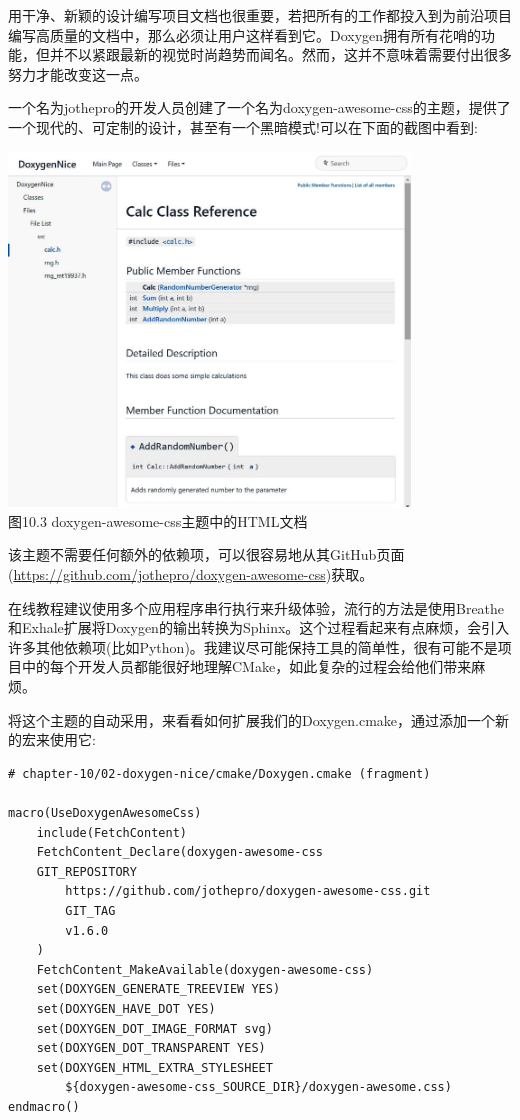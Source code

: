 

用干净、新颖的设计编写项目文档也很重要，若把所有的工作都投入到为前沿项目编写高质量的文档中，那么必须让用户这样看到它。Doxygen拥有所有花哨的功能，但并不以紧跟最新的视觉时尚趋势而闻名。然而，这并不意味着需要付出很多努力才能改变这一点。

一个名为jothepro的开发人员创建了一个名为doxygen-awesome-css的主题，提供了一个现代的、可定制的设计，甚至有一个黑暗模式!可以在下面的截图中看到:

\begin{center}
\includegraphics[width=0.8\textwidth]{content/3/chapter10/images/3.jpg}\\
图10.3  doxygen-awesome-css主题中的HTML文档
\end{center}

该主题不需要任何额外的依赖项，可以很容易地从其GitHub页面(\url{https://github.com/jothepro/doxygen-awesome-css})获取。

\begin{tcolorbox}[colback=blue!5!white,colframe=blue!75!black,title=Note]
在线教程建议使用多个应用程序串行执行来升级体验，流行的方法是使用Breathe和Exhale扩展将Doxygen的输出转换为Sphinx。这个过程看起来有点麻烦，会引入许多其他依赖项(比如Python)。我建议尽可能保持工具的简单性，很有可能不是项目中的每个开发人员都能很好地理解CMake，如此复杂的过程会给他们带来麻烦。
\end{tcolorbox}

将这个主题的自动采用，来看看如何扩展我们的Doxygen.cmake，通过添加一个新的宏来使用它:

\begin{lstlisting}[style=styleCMake]
# chapter-10/02-doxygen-nice/cmake/Doxygen.cmake (fragment)

macro(UseDoxygenAwesomeCss)
	include(FetchContent)
	FetchContent_Declare(doxygen-awesome-css
	GIT_REPOSITORY
		https://github.com/jothepro/doxygen-awesome-css.git
		GIT_TAG
		v1.6.0
	)
	FetchContent_MakeAvailable(doxygen-awesome-css)
	set(DOXYGEN_GENERATE_TREEVIEW YES)
	set(DOXYGEN_HAVE_DOT YES)
	set(DOXYGEN_DOT_IMAGE_FORMAT svg)
	set(DOXYGEN_DOT_TRANSPARENT YES)
	set(DOXYGEN_HTML_EXTRA_STYLESHEET
		${doxygen-awesome-css_SOURCE_DIR}/doxygen-awesome.css)
endmacro()
\end{lstlisting}

